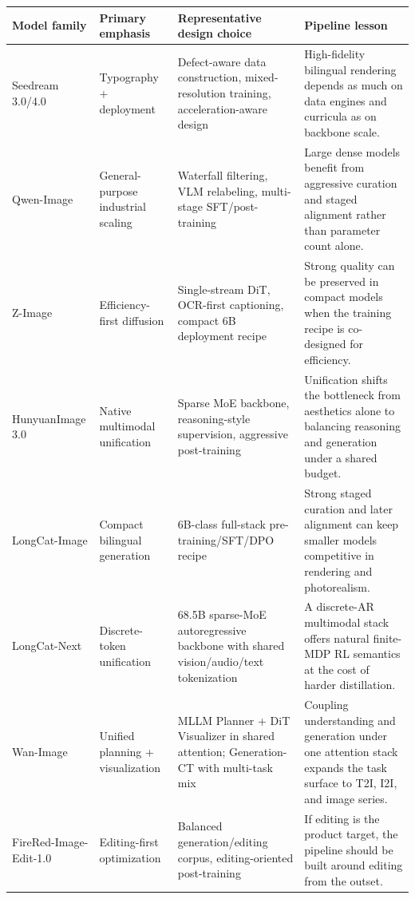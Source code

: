 \documentclass{llmxive}
\providecommand{\arraystretch}{1.20}
\begin{document}
\begin{table}[t]
\centering
\footnotesize
\setlength{\tabcolsep}{3.5pt}
\renewcommand{\arraystretch}{1.12}
\begin{tabularx}{\textwidth}{@{}>{\arraybackslash}p{2.9cm}>{\arraybackslash}p{2.4cm}>{\arraybackslash}p{4.0cm}>{\arraybackslash}X@{}}
\toprule
\textbf{Model family} & \textbf{Primary emphasis} & \textbf{Representative design choice} & \textbf{Pipeline lesson} \\
\midrule
Seedream 3.0/4.0 \citep{gao2025seedream,seedream2025seedream} & Typography + deployment & Defect-aware data construction, mixed-resolution training, acceleration-aware design & High-fidelity bilingual rendering depends as much on data engines and curricula as on backbone scale. \\
Qwen-Image \citep{wu2025qwen} & General-purpose industrial scaling & Waterfall filtering, VLM relabeling, multi-stage SFT/post-training & Large dense models benefit from aggressive curation and staged alignment rather than parameter count alone. \\
Z-Image \citep{cai2025z} & Efficiency-first diffusion & Single-stream DiT, OCR-first captioning, compact 6B deployment recipe & Strong quality can be preserved in compact models when the training recipe is co-designed for efficiency. \\
HunyuanImage 3.0 \citep{cao2025hunyuanimage} & Native multimodal unification & Sparse MoE backbone, reasoning-style supervision, aggressive post-training & Unification shifts the bottleneck from aesthetics alone to balancing reasoning and generation under a shared budget. \\
LongCat-Image \citep{team2025longcat} & Compact bilingual generation & 6B-class full-stack pre-training/SFT/DPO recipe & Strong staged curation and later alignment can keep smaller models competitive in rendering and photorealism. \\
LongCat-Next \citep{team2026longcat} & Discrete-token unification & 68.5B sparse-MoE autoregressive backbone with shared vision/audio/text tokenization & A discrete-AR multimodal stack offers natural finite-MDP RL semantics at the cost of harder distillation. \\
Wan-Image \citep{mao2026wan} & Unified planning + visualization & MLLM Planner + DiT Visualizer in shared attention; Generation-CT with multi-task mix & Coupling understanding and generation under one attention stack expands the task surface to T2I, I2I, and image series. \\
FireRed-Image-Edit-1.0 \citep{team2026firered} & Editing-first optimization & Balanced generation/editing corpus, editing-oriented post-training & If editing is the product target, the pipeline should be built around editing from the outset. \\

\end{tabularx}
\end{table}
\end{document}
